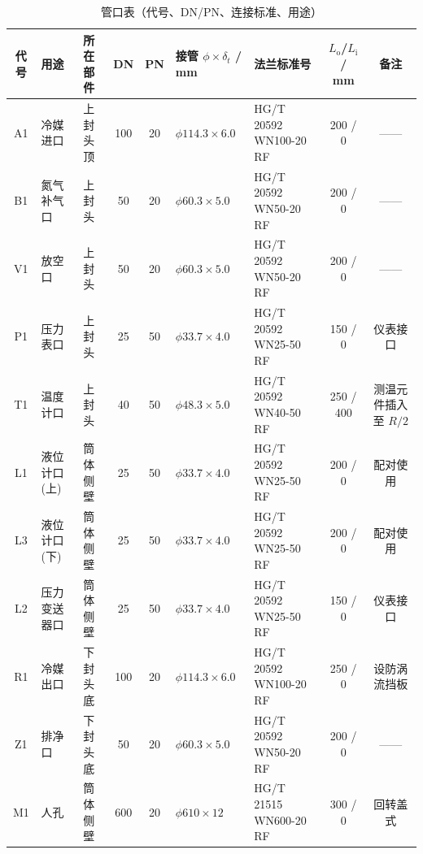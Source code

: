 \begin{table}[!htb]
  \centering
  \caption{管口表（代号、DN/PN、连接标准、用途）}
  \label{tab:nozzle-specs}
  \small\renewcommand{\arraystretch}{1.25}
  \setlength{\tabcolsep}{4pt}
  \begin{tabularx}{\textwidth}{@{}c >{\centering\arraybackslash}X >{\centering\arraybackslash}X c c >{\centering\arraybackslash}X >{\centering\arraybackslash}X c c@{}}
    \toprule
    \textbf{代号} & \textbf{用途} & \textbf{所在部件} & \textbf{DN} & \textbf{PN} & \textbf{接管 $\phi \times \delta_t$ / mm} & \textbf{法兰标准号} & \textbf{$L_{\mathrm{o}}$/$L_{\mathrm{i}}$ / mm} & \textbf{备注} \\
    \midrule
    A1   & 冷媒进口    & 上封头顶   & 100 & 20 & $\phi 114.3 \times 6.0$ & HG/T 20592 WN100-20 RF & 200 / 0  & —— \\
    B1   & 氮气补气口  & 上封头     & 50  & 20 & $\phi 60.3 \times 5.0$  & HG/T 20592 WN50-20 RF  & 200 / 0  & —— \\
    V1   & 放空口      & 上封头     & 50  & 20 & $\phi 60.3 \times 5.0$  & HG/T 20592 WN50-20 RF  & 200 / 0  & —— \\
    P1   & 压力表口    & 上封头     & 25  & 50 & $\phi 33.7 \times 4.0$  & HG/T 20592 WN25-50 RF  & 150 / 0  & 仪表接口 \\
    T1   & 温度计口    & 上封头     & 40  & 50 & $\phi 48.3 \times 5.0$  & HG/T 20592 WN40-50 RF  & 250 / 400 & 测温元件插入至 $R/2$ \\
    L1   & 液位计口(上)& 筒体侧壁  & 25  & 50 & $\phi 33.7 \times 4.0$  & HG/T 20592 WN25-50 RF  & 200 / 0  & 配对使用 \\
    L3   & 液位计口(下)& 筒体侧壁  & 25  & 50 & $\phi 33.7 \times 4.0$  & HG/T 20592 WN25-50 RF  & 200 / 0  & 配对使用 \\
    L2   & 压力变送器口 & 筒体侧壁  & 25  & 50 & $\phi 33.7 \times 4.0$  & HG/T 20592 WN25-50 RF  & 150 / 0  & 仪表接口 \\
    R1   & 冷媒出口    & 下封头底   & 100 & 20 & $\phi 114.3 \times 6.0$ & HG/T 20592 WN100-20 RF & 250 / 0  & 设防涡流挡板 \\
    Z1   & 排净口      & 下封头底   & 50  & 20 & $\phi 60.3 \times 5.0$  & HG/T 20592 WN50-20 RF  & 200 / 0  & —— \\
    M1   & 人孔        & 筒体侧壁   & 600 & 20 & $\phi 610 \times 12$     & HG/T 21515 WN600-20 RF & 300 / 0  & 回转盖式 \\
    \bottomrule
  \end{tabularx}
\end{table}

